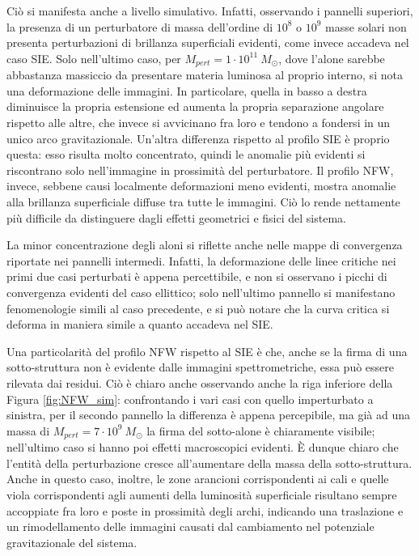 Ciò si manifesta anche a livello simulativo. Infatti, osservando i pannelli superiori, la presenza di un perturbatore di massa dell'ordine di $10^8$ o $10^9$ masse solari non presenta perturbazioni di brillanza superficiali evidenti, come invece accadeva nel caso SIE. Solo nell'ultimo caso, per $M_{pert}=1 \cdot 10^{11}\ M_\odot$, dove l'alone sarebbe abbastanza massiccio da presentare materia luminosa al proprio interno, si nota una deformazione delle immagini. In particolare, quella in basso a destra diminuisce la propria estensione ed aumenta la propria separazione angolare rispetto alle altre, che invece si avvicinano fra loro e tendono a fondersi in un unico arco gravitazionale. 
Un'altra differenza rispetto al profilo SIE è proprio questa: esso risulta molto concentrato, quindi le anomalie più evidenti si riscontrano solo nell'immagine in prossimità del perturbatore. Il profilo NFW, invece, sebbene causi localmente deformazioni meno evidenti, mostra anomalie alla brillanza superficiale diffuse tra tutte le immagini. Ciò lo rende nettamente più difficile da distinguere dagli effetti geometrici e fisici del sistema. 

La minor concentrazione degli aloni si riflette anche nelle mappe di convergenza riportate nei pannelli intermedi. Infatti, la deformazione delle linee critiche nei primi due casi perturbati è appena percettibile, e non si osservano i picchi di convergenza evidenti del caso ellittico; solo nell'ultimo pannello si manifestano fenomenologie simili al caso precedente, e si può notare che la curva critica si deforma in maniera simile a quanto accadeva nel SIE.

Una particolarità del profilo NFW rispetto al SIE è che, anche se la firma di una sotto-struttura non è evidente dalle immagini spettrometriche, essa può essere rilevata dai residui. Ciò è chiaro anche osservando anche la riga inferiore della Figura \ref{fig:NFW_sim}: confrontando i vari casi con quello imperturbato a sinistra, per il secondo pannello la differenza è appena percepibile, ma già ad una massa di $M_{pert}=7 \cdot 10^{9}\ M_\odot$ la firma del sotto-alone è chiaramente visibile; nell'ultimo caso si hanno poi effetti macroscopici evidenti. È dunque chiaro che l'entità della perturbazione cresce all'aumentare della massa della sotto-struttura. Anche in questo caso, inoltre, le zone arancioni corrispondenti ai cali e quelle viola corrispondenti agli aumenti della luminosità superficiale risultano sempre accoppiate fra loro e poste in prossimità degli archi, indicando una traslazione e un rimodellamento delle immagini causati dal cambiamento nel potenziale gravitazionale del sistema. 

